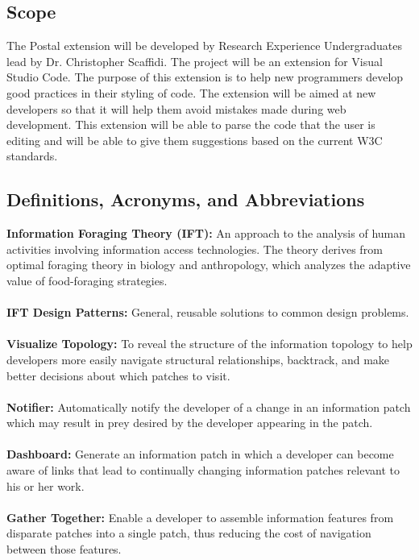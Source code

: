 \documentclass[letterpaper,10pt,titlepage,draftclsnofoot,onecolumn,onesided] {IEEEtran}
\begin{document}
\subsection{Scope}
The Postal extension will be developed by Research Experience Undergraduates lead by Dr. Christopher Scaffidi. 
The project will be an extension for Visual Studio Code.
The purpose of this extension is to help new programmers develop good practices in their styling of code.
The extension will be aimed at new developers so that it will help them avoid  mistakes made during web development.
This extension will be able to parse the code that the user is editing and will be able to give them suggestions based on the current W3C standards. 

\subsection{Definitions, Acronyms, and Abbreviations}
\setlength\parindent{0pt} \textbf{Information Foraging Theory (IFT):} 
An approach to the analysis of human activities involving information access technologies.
The theory derives from optimal foraging theory in biology and anthropology, which analyzes the adaptive value of food-foraging strategies.\cite{xeroxift}\\\\
\textbf{IFT Design Patterns:} 
General, reusable solutions to common design problems.\cite{iftwiki}\\\\
\textbf{Visualize Topology:} 
To reveal the structure of the information topology to help developers more easily navigate structural relationships, backtrack, and make better decisions about which patches to visit.\cite{iftwiki}\\\\
\textbf{Notifier:} 
Automatically notify the developer of a change in an information patch which may result in prey desired by the developer appearing in the patch.\cite{iftwiki}\\\\
\textbf{Dashboard:} 
Generate an information patch in which a developer can become aware of links that lead to continually changing information patches relevant to his or her work.\cite{iftwiki}\\\\
\textbf{Gather Together:} 
Enable a developer to assemble information features from disparate patches into a single patch, thus reducing the cost of navigation between those features.\cite{iftwiki}\\\\
\end{document}
